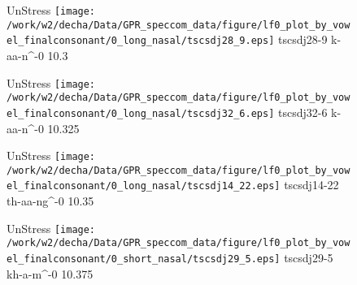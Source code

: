\documentclass{article}
\begin{document}
\begin{figure}[t]
\begin{minipage}[b]{.24\textwidth}
UnStress
\centering
\texttt{[image: /work/w2/decha/Data/GPR\_speccom\_data/figure/lf0\_plot\_by\_vowel\_finalconsonant/0\_long\_nasal/tscsdj28\_9.eps]}
tscsdj28-9 k-aa-n\textasciicircum-0 10.3
\end{minipage}
\begin{minipage}[b]{.24\textwidth}
UnStress
\centering
\texttt{[image: /work/w2/decha/Data/GPR\_speccom\_data/figure/lf0\_plot\_by\_vowel\_finalconsonant/0\_long\_nasal/tscsdj32\_6.eps]}
tscsdj32-6 k-aa-n\textasciicircum-0 10.325
\end{minipage}
\begin{minipage}[b]{.24\textwidth}
UnStress
\centering
\texttt{[image: /work/w2/decha/Data/GPR\_speccom\_data/figure/lf0\_plot\_by\_vowel\_finalconsonant/0\_long\_nasal/tscsdj14\_22.eps]}
tscsdj14-22 th-aa-ng\textasciicircum-0 10.35
\end{minipage}
\begin{minipage}[b]{.24\textwidth}
UnStress
\centering
\texttt{[image: /work/w2/decha/Data/GPR\_speccom\_data/figure/lf0\_plot\_by\_vowel\_finalconsonant/0\_short\_nasal/tscsdj29\_5.eps]}
tscsdj29-5 kh-a-m\textasciicircum-0 10.375
\end{minipage}
\end{figure}
\end{document}
